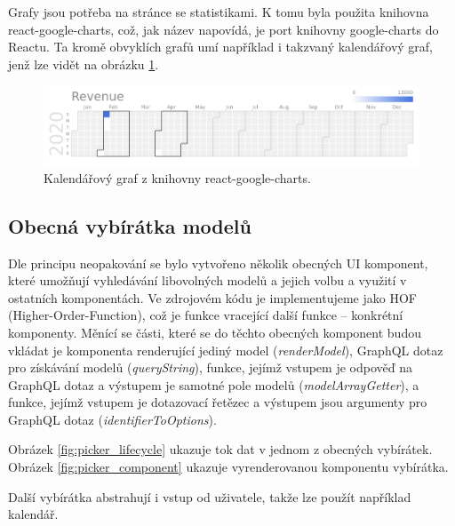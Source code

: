 \noindent
Grafy jsou potřeba na stránce se statistikami. K tomu byla použita knihovna react-google-charts,
což, jak název napovídá, je port knihovny google-charts do Reactu. Ta kromě obvyklích grafů umí
například i takzvaný kalendářový graf, jenž lze vidět na obrázku \ref{fig:google_charts}.

\begin{figure}[!htb] \centering
  \includegraphics[width=145mm]{../img/google_charts.png}
  \caption{Kalendářový graf z knihovny react-google-charts.}
  \label{fig:google_charts}
\end{figure}

\subsection{Obecná vybírátka modelů}

\noindent
Dle principu neopakování se bylo vytvořeno několik obecných UI komponent, které umožňují vyhledávání libovolných
modelů a jejich volbu a využití v ostatních komponentách. Ve zdrojovém kódu je implementujeme jako
HOF (Higher-Order-Function), což je funkce vracející další funkce -- konkrétní komponenty.
Měnící se části, které se do těchto obecných komponent budou vkládat je komponenta renderující jediný model
(\textit{renderModel}),
GraphQL dotaz pro získávání modelů (\textit{queryString}), funkce, jejímž vstupem je odpověď na GraphQL dotaz a výstupem je
samotné pole modelů (\textit{modelArrayGetter}), a funkce, jejímž vstupem je dotazovací řetězec a výstupem jsou
argumenty pro GraphQL dotaz (\textit{identifierToOptions}).

Obrázek \ref{fig:picker_lifecycle} ukazuje tok dat v jednom z obecných vybírátek.
Obrázek \ref{fig:picker_component} ukazuje vyrenderovanou komponentu vybírátka.

Další vybírátka abstrahují i vstup od uživatele, takže lze použít například kalendář.

